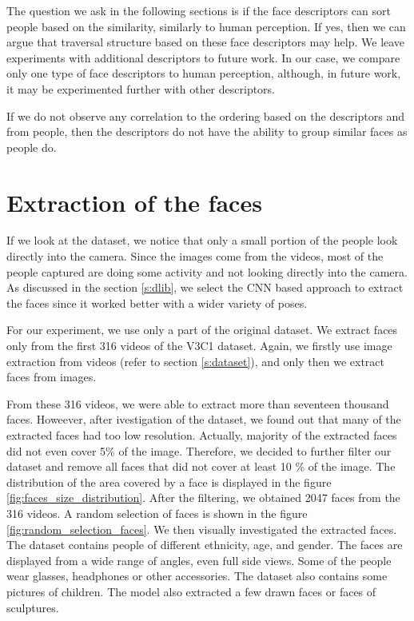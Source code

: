 
The question we ask in the following sections is if the face descriptors can sort people based on the similarity, similarly to human perception. If yes, then we can argue that traversal structure based on these face descriptors may help. We leave experiments with additional descriptors to future work. In our case, we compare only one type of face descriptors to human perception, although, in future work, it may be experimented further with other descriptors.


If we do not observe any correlation to the ordering based on the descriptors and from people, then the descriptors do not have the ability to group similar faces as people do. 

\section{Extraction of the faces}

If we look at the dataset, we notice that only a small portion of the people look directly into the camera. Since the images come from the videos, most of the people captured are doing some activity and not looking directly into the camera. As discussed in the section \ref{s:dlib}, we select the CNN based approach to extract the faces since it worked better with a wider variety of poses.

For our experiment, we use only a part of the original dataset. We extract faces only from the first 316 videos of the V3C1 dataset. Again, we firstly use image extraction from videos (refer to section \ref{s:dataset}), and only then we extract faces from images. 

From these 316 videos, we were able to extract more than seventeen thousand faces. Howeever, after ivestigation of the dataset, we found out that many of the extracted faces had too low resolution. Actually, majority of the extracted faces did not even cover 5\% of the image. Therefore, we decided to further filter our dataset and remove all faces that did not cover at least 10 \% of the image. The distribution of the area covered by a face is displayed in the figure \ref{fig:faces_size_distribution}. After the filtering,  we obtained 2047 faces from the 316 videos. A random selection of faces is shown in the figure \ref{fig:random_selection_faces}. We then visually investigated the extracted faces. The dataset contains people of different ethnicity, age, and gender. The faces are displayed from a wide range of angles, even full side views. Some of the people wear glasses, headphones or other accessories. The dataset also contains some pictures of children. The model also extracted a few drawn faces or faces of sculptures.

